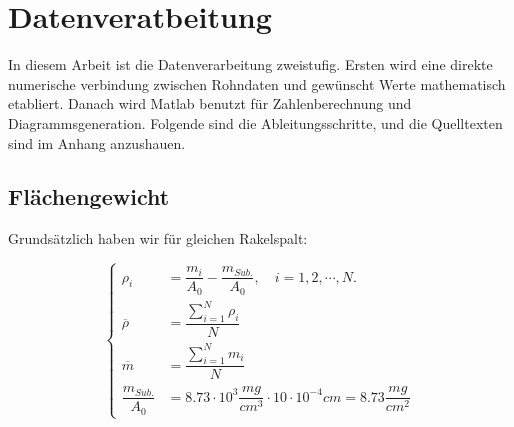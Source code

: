 \documentclass[12pt,UTF8]{article}
\begin{document}
\section{Datenveratbeitung}
In diesem Arbeit ist die Datenverarbeitung zweistufig. Ersten wird eine direkte numerische verbindung zwischen Rohndaten und gew\"unscht Werte mathematisch etabliert. Danach wird Matlab benutzt f\"ur Zahlenberechnung und Diagrammsgeneration. Folgende sind die Ableitungsschritte, und die Quelltexten sind im Anhang anzushauen.
\subsection{Flächengewicht}
Grunds\"atzlich haben wir f\"ur gleichen Rakelspalt:
\begin{center}
    \begin{equation}
        \left\{
        \begin{aligned}
            \rho_{i}                & =\dfrac{m_{i}}{A_{0}}-\dfrac{m_{Sub.}}{A_{0}},\quad i=1,2,\cdots,N.      \\
            \overline{\rho}         & =\dfrac{\sum\limits_{i=1}^{N}\rho_{i}}{N}                                \\
            \overline{m}            & =\dfrac{\sum\limits_{i=1}^{N}m_{i}}{N}                                   \\
            \dfrac{m_{Sub.}}{A_{0}} & =8.73\cdot10^3\dfrac{mg}{cm^3}\cdot10\cdot10^{-4}cm=8.73\dfrac{mg}{cm^2}
        \end{aligned}
        \right.
    \end{equation}
\end{center}
\end{document}

